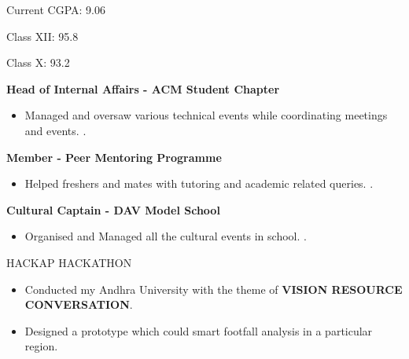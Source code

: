 \documentclass[11pt,a4paper,ragged2e]{altacv}
\begin{document}


\tagline{}



\begin{fullwidth}
\makecvheader
\end{fullwidth}




Current CGPA: 9.06

\smallskip
\divider

   
Class XII: 95.8 \faPercent


Class X: 93.2 \faPercent
\smallskip
\smallskip



	
         \textbf{Head of Internal Affairs - ACM Student Chapter} 
         
         \begin{itemize}
    \item{Managed and oversaw various technical events while coordinating meetings and events. }. 
\end{itemize}
\smallskip

 \textbf{Member - Peer Mentoring Programme} 
         
         \begin{itemize}
    \item{Helped freshers and mates with tutoring and academic related queries. }. 
\end{itemize}
\smallskip

 \textbf{Cultural Captain - DAV Model School} 
         
         \begin{itemize}
    \item{Organised and Managed all the cultural events in school. }. 
\end{itemize}



\smallskip
\smallskip
{}
 {HACKAP HACKATHON }
\begin{itemize}
    
    \item Conducted my Andhra University with the theme of \textbf{VISION RESOURCE CONVERSATION}.
    \item Designed a prototype which could smart footfall analysis in a particular region.
\end{itemize}
\smallskip

\clearpage

\nocite{*}
\end{document}
